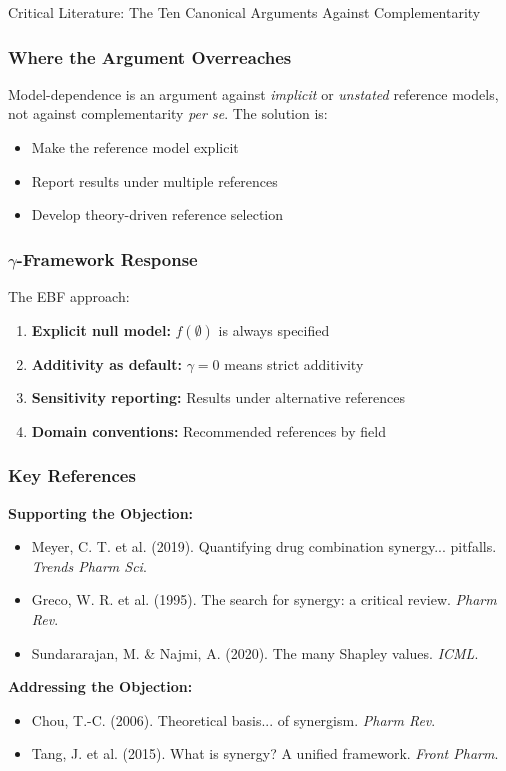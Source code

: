 \begin{chapter}{Critical Literature: The Ten Canonical Arguments Against Complementarity}
\subsubsection{Where the Argument Overreaches}

Model-dependence is an argument against \textit{implicit} or \textit{unstated} reference models, not against complementarity \textit{per se}. The solution is:
\begin{itemize}[noitemsep]
    \item Make the reference model explicit
    \item Report results under multiple references
    \item Develop theory-driven reference selection
\end{itemize}

\subsubsection{$\gamma$-Framework Response}

The EBF approach:
\begin{enumerate}
    \item \textbf{Explicit null model:} $f(\emptyset)$ is always specified
    \item \textbf{Additivity as default:} $\gamma = 0$ means strict additivity
    \item \textbf{Sensitivity reporting:} Results under alternative references
    \item \textbf{Domain conventions:} Recommended references by field
\end{enumerate}

\subsubsection{Key References}

\textbf{Supporting the Objection:}
\begin{itemize}[noitemsep]
    \item Meyer, C. T. et al. (2019). Quantifying drug combination synergy... pitfalls. \textit{Trends Pharm Sci}.
    \item Greco, W. R. et al. (1995). The search for synergy: a critical review. \textit{Pharm Rev}.
    \item Sundararajan, M. \& Najmi, A. (2020). The many Shapley values. \textit{ICML}.
\end{itemize}

\textbf{Addressing the Objection:}
\begin{itemize}[noitemsep]
    \item Chou, T.-C. (2006). Theoretical basis... of synergism. \textit{Pharm Rev}.
    \item Tang, J. et al. (2015). What is synergy? A unified framework. \textit{Front Pharm}.
\end{itemize}


\end{chapter}
